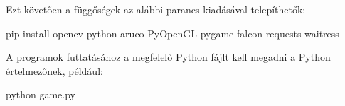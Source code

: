 \noindent Ezt követően a függőségek az alábbi parancs kiadásával telepíthetők:
\begin{python}
pip install opencv-python aruco PyOpenGL pygame falcon requests waitress
\end{python}
A programok futtatásához a megfelelő Python fájlt kell megadni a Python értelmezőnek, például:
\begin{python}
python game.py
\end{python}
